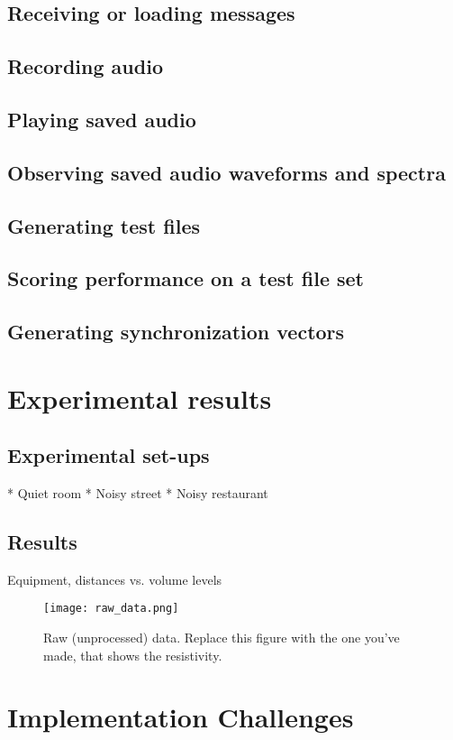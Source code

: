 \documentclass[a4paper]{article}
\begin{document}
\subsection{Receiving or loading messages}
\subsection{Recording audio}
\subsection{Playing saved audio}
\subsection{Observing saved audio waveforms and spectra}
\subsection{Generating test files}
\subsection{Scoring performance on a test file set}
\subsection{Generating synchronization vectors}

\section{Experimental results}
\subsection{Experimental set-ups}
* Quiet room
* Noisy street
* Noisy restaurant
\subsection{Results}
Equipment, distances vs. volume levels
\begin{figure}
\centering
\texttt{[image: raw\_data.png]}
\caption{\label{fig:data}Raw (unprocessed) data. Replace this figure with the one you've made, that shows the resistivity.}
\end{figure}

\section{Implementation Challenges}
\end{document}
